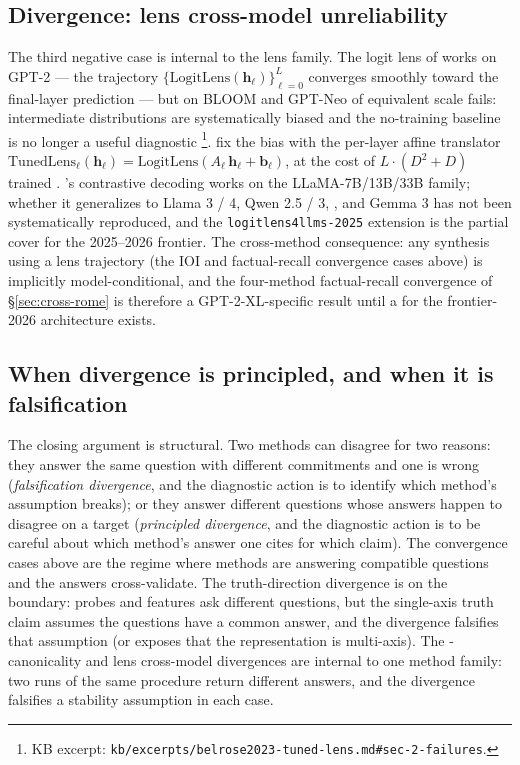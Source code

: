 \subsection{Divergence: lens cross-model unreliability}
\label{sec:cross-lens}

The third negative case is internal to the lens family. The logit
lens of \citet{nostalgebraist2020-logit-lens} works on GPT-2 ---
the trajectory $\{\mathrm{LogitLens}(\mathbf{h}_\ell)\}_{\ell=0}^L$
converges smoothly toward the final-layer prediction --- but on
BLOOM and GPT-Neo of equivalent scale fails: intermediate
distributions are systematically biased and the no-training
baseline is no longer a useful diagnostic
\citep[\S 2.2]{belrose2023-tuned-lens}\footnote{KB excerpt:
\nolinkurl{kb/excerpts/belrose2023-tuned-lens.md#sec-2-failures}.}.
\citet{belrose2023-tuned-lens} fix the bias with the per-layer
affine translator
$\mathrm{TunedLens}_\ell(\mathbf{h}_\ell) = \mathrm{LogitLens}(A_\ell\,
\mathbf{h}_\ell + \mathbf{b}_\ell)$, at the cost of
$L\!\cdot\!(D^2 + D)$ trained .
\citet{chuang2023-dola}'s  contrastive decoding works on the
LLaMA-7B/13B/33B family; whether it generalizes to Llama 3 / 4,
Qwen 2.5 / 3, , and Gemma 3 has not been systematically
reproduced, and the \texttt{logitlens4llms-2025} extension is the
partial cover for the 2025--2026 frontier. The cross-method
consequence: any synthesis using a lens trajectory (the IOI and
factual-recall convergence cases above) is implicitly
model-conditional, and the four-method factual-recall convergence
of \S\ref{sec:cross-rome} is therefore a GPT-2-XL-specific result
until a  for the frontier-2026 architecture exists.

\subsection{When divergence is principled, and when it is falsification}
\label{sec:cross-principle}

The closing argument is structural. Two methods can disagree for
two reasons: they answer the same question with different
commitments and one is wrong (\emph{falsification divergence}, and
the diagnostic action is to identify which method's assumption
breaks); or they answer different questions whose answers happen
to disagree on a target (\emph{principled divergence}, and the
diagnostic action is to be careful about which method's answer one
cites for which claim). The convergence cases above are the regime
where methods are answering compatible questions and the answers
cross-validate. The truth-direction divergence is on the boundary:
probes and  features ask different questions, but the
single-axis truth claim assumes the questions have a common answer,
and the divergence falsifies that assumption (or exposes that the
representation is multi-axis). The -canonicality and lens
cross-model divergences are internal to one method family: two
runs of the same procedure return different answers, and the
divergence falsifies a stability assumption in each case.

